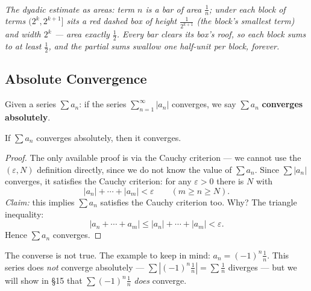 \documentclass[11pt]{report}
\newcommand{\figcap}[1]{\\[1.5mm]\parbox{0.92\textwidth}{\small\itshape #1}}
\begin{document}
\begin{center}
\figcap{The dyadic estimate as areas: term $n$ is a bar of area $\tfrac1n$; under each block of terms $(2^k, 2^{k+1}]$ sits a red dashed box of height $\tfrac{1}{2^{k+1}}$ (the block's smallest term) and width $2^k$ --- area exactly $\tfrac12$. Every bar clears its box's roof, so each block sums to at least $\tfrac12$, and the partial sums swallow one half-unit per block, forever.}
\end{center}


\subsection{Absolute Convergence}

\begin{defbox}
Given a series $\sum a_n$: if the series $\sum_{n=1}^\infty |a_n|$ converges, we say $\sum a_n$ \textbf{converges absolutely}.
\end{defbox}

\begin{propbox}
If $\sum a_n$ converges absolutely, then it converges.
\end{propbox}

\begin{proof}
The only available proof is via the Cauchy criterion --- we cannot use the $(\varepsilon,N)$ definition directly, since we do not know the value of $\sum a_n$. Since $\sum |a_n|$ converges, it satisfies the Cauchy criterion: for any $\varepsilon > 0$ there is $N$ with
\[
|a_n| + \cdots + |a_m| < \varepsilon \qquad (m \geq n \geq N).
\]
\emph{Claim:} this implies $\sum a_n$ satisfies the Cauchy criterion too. Why? The triangle inequality:
\[
|a_n + \cdots + a_m| \leq |a_n| + \cdots + |a_m| < \varepsilon.
\]
Hence $\sum a_n$ converges.
\end{proof}

\begin{rembox}[Warning]
The converse is not true. The example to keep in mind: $a_n = (-1)^n \tfrac1n$. This series does \emph{not} converge absolutely --- $\sum |(-1)^n \tfrac1n| = \sum \tfrac1n$ diverges --- but we will show in \S 15 that $\sum (-1)^n \tfrac1n$ \emph{does} converge.
\end{rembox}
\end{document}
